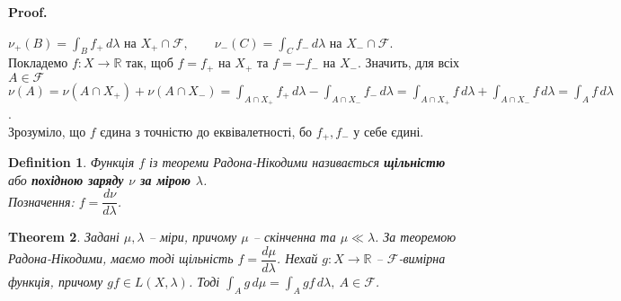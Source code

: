 \documentclass[a4paper, 10pt]{article}
\makeatletter
\theoremstyle{theoremdd}
\newtheorem{theorem}{Theorem}[subsection]
\newtheorem{definition}[theorem]{Definition}
\renewenvironment{proof}[1][Proof.\\]{\par
\pushQED{\hfill \qed}%
\normalfont \topsep6\p@\@plus6\p@\relax
\trivlist
\item\relax
{\bfseries
#1\@addpunct{.}}\hspace\labelsep\ignorespaces
}{%
\popQED\endtrivlist\@endpefalse
}
\makeatother
\begin{document}
\begin{proof}
$\nu_+(B) = \displaystyle\int_B f_+\,d\lambda \text{ на } X_+ \cap \mathcal{F}, \qquad \nu_-(C) = \displaystyle\int_C f_-\,d\lambda \text{ на } X_- \cap \mathcal{F}$.\\
Покладемо $f \colon X \to \mathbb{R}$ так, щоб $f = f_+$ на $X_+$ та $f = -f_-$ на $X_-$. Значить, для всіх $A \in \mathcal{F}$\\
$\nu(A) = \nu(A \cap X_+) + \nu(A \cap X_-) = \displaystyle\int_{A \cap X_+} f_+\,d\lambda - \int_{A \cap X_-}f_-\,d\lambda = \int_{A \cap X_+} f\,d\lambda + \int_{A \cap X_-}f\,d\lambda = \int_A f\,d\lambda$.\\
Зрозуміло, що $f$ єдина з точністю до еквівалетності, бо $f_+,f_-$ у себе єдині. 
\end{proof}

\begin{definition}
Функція $f$ із теореми Радона-Нікодими називається \textbf{щільністю} або \textbf{похідною заряду $\nu$ за мірою $\lambda$}.\\
Позначення: $f = \dfrac{d\nu}{d\lambda}$.
\end{definition}

\begin{theorem}
Задані $\mu,\lambda$ -- міри, причому $\mu$ -- скінченна та $\mu \ll \lambda$. За теоремою Радона-Нікодими, маємо тоді щільність $f = \dfrac{d\mu}{d\lambda}$. Нехай $g \colon X \to \mathbb{R}$ -- $\mathcal{F}$-вимірна функція, причому $gf \in L(X,\lambda)$. Тоді $\displaystyle\int_A g\,d\mu = \int_A gf\,d\lambda,\ A \in \mathcal{F}$.
\end{theorem}
\end{document}
